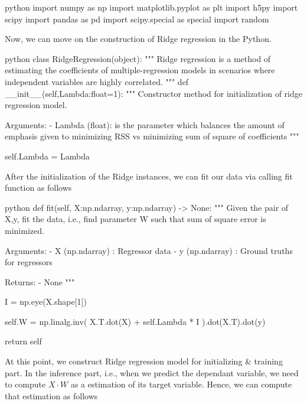 \documentclass[12pt]{amsart}
\begin{document}
\begin{mintedbox}{python}
import numpy as np
import matplotlib.pyplot as plt
import h5py
import scipy
import pandas as pd
import scipy.special as special
import random
\end{mintedbox}

Now, we can move on the construction of Ridge regression in the Python.
\begin{mintedbox}{python}
class RidgeRegression(object):
    """
        Ridge regression is a method of estimating the coefficients of multiple-regression models in scenarios where independent variables are highly correlated. 
    """
    def __init__(self,Lambda:float=1):
        """
            Constructor method for initialization of ridge regression model.
            
                Arguments:
                    - Lambda (float): is the parameter which balances the amount of emphasis given to minimizing RSS vs minimizing sum of square of coefficients
        """

        self.Lambda = Lambda   
\end{mintedbox}

After the initialization of the Ridge instances, we can fit our data via calling fit function as follows
\begin{mintedbox}{python}
  def fit(self, X:np.ndarray, y:np.ndarray) -> None:
        """
            Given the pair of X,y, fit the data, i.e., find parameter W such that sum of square error is minimized. 
            
                Arguments:
                    - X (np.ndarray) : Regressor data 
                    - y (np.ndarray) : Ground truths for regressors

                Returns:
                    - None
        """
               
        I = np.eye(X.shape[1])
        
        self.W = np.linalg.inv(
            X.T.dot(X) + self.Lambda * I
            ).dot(X.T).dot(y)

        return self 
\end{mintedbox}



At this point, we construct Ridge regression model for initializing \& training part. In the inference part, i.e., when we predict the dependant variable, we need to compute $X \cdot W$ as a estimation of its target variable. Hence, we can compute that estimation as follows
\end{document}
